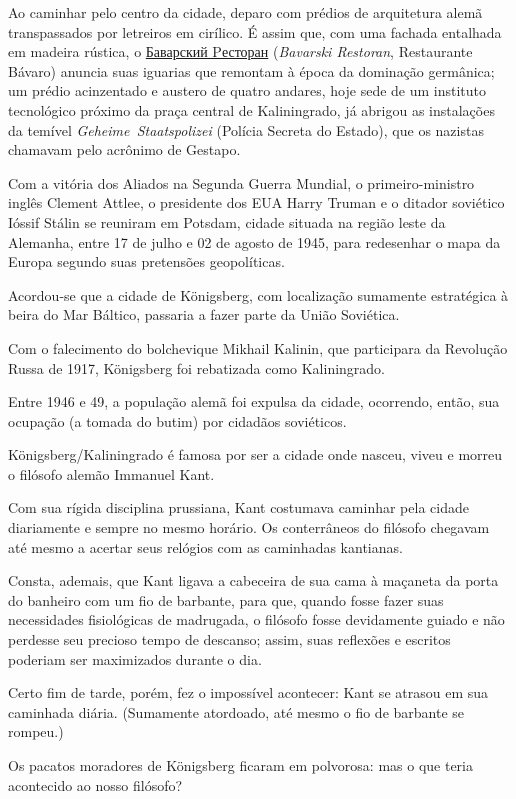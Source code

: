Ao caminhar pelo centro da cidade, deparo com prédios de arquitetura
alemã transpassados por letreiros em cirílico. É assim que, com uma
fachada entalhada em madeira rústica, o
\href{http://www.zoetler.ru/leninskij/}{Баварский Pесторан}
(\emph{Bavarski Restoran}, Restaurante Bávaro) anuncia suas iguarias que
remontam à época da dominação germânica; um prédio acinzentado e austero
de quatro andares, hoje sede de um instituto tecnológico próximo da
praça central de Kaliningrado, já abrigou as instalações da temível
\emph{Geheime~Staatspolizei} (Polícia Secreta do Estado), que os
nazistas chamavam pelo acrônimo de Gestapo.

Com a vitória dos Aliados na Segunda Guerra Mundial, o primeiro-ministro
inglês Clement Attlee, o presidente dos EUA Harry Truman e o ditador
soviético Ióssif Stálin se reuniram em Potsdam, cidade situada na região
leste da Alemanha, entre 17 de julho e 02 de agosto de 1945, para
redesenhar o mapa da Europa segundo suas pretensões geopolíticas.

Acordou-se que a cidade de Königsberg, com localização sumamente
estratégica à beira do Mar Báltico, passaria a fazer parte da União
Soviética.

Com o falecimento do bolchevique Mikhail Kalinin, que participara da
Revolução Russa de 1917, Königsberg foi rebatizada como Kaliningrado.

Entre 1946 e 49, a população alemã foi expulsa da cidade, ocorrendo,
então, sua ocupação (a tomada do butim) por cidadãos soviéticos.

Königsberg/Kaliningrado é famosa por ser a cidade onde nasceu, viveu e
morreu o filósofo alemão Immanuel Kant.

Com sua rígida disciplina prussiana, Kant costumava caminhar pela cidade
diariamente e sempre no mesmo horário. Os conterrâneos do filósofo
chegavam até mesmo a acertar seus relógios com as caminhadas kantianas.

Consta, ademais, que Kant ligava a cabeceira de sua cama à maçaneta da
porta do banheiro com um fio de barbante, para que, quando fosse fazer
suas necessidades fisiológicas de madrugada, o filósofo fosse
devidamente guiado e não perdesse seu precioso tempo de descanso; assim,
suas reflexões e escritos poderiam ser maximizados durante o dia.

Certo fim de tarde, porém, fez o impossível acontecer: Kant se atrasou
em sua caminhada diária. (Sumamente atordoado, até mesmo o fio de
barbante se rompeu.)

Os pacatos moradores de Königsberg ficaram em polvorosa: mas o que teria
acontecido ao nosso filósofo?

